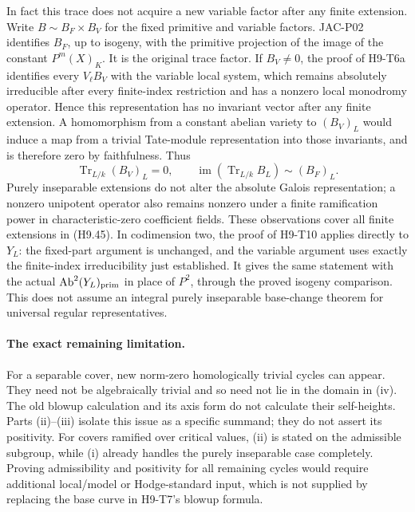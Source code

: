 In fact this trace does not acquire a new variable factor after any
finite extension. Write $B\sim B_F\times B_V$ for the fixed primitive
and variable factors. JAC-P02 identifies $B_F$, up to isogeny, with
the primitive projection of the image of the constant
$P^m(X)_K$. It is the original trace factor. If $B_V\ne0$, the proof
of H9-T6a identifies every $V_\ell B_V$ with the variable local system,
which remains absolutely irreducible after every finite-index
restriction and has a nonzero local monodromy operator. Hence this
representation has no invariant vector after any finite extension.
A homomorphism from a constant abelian variety to $(B_V)_L$ would
induce a map from a trivial Tate-module representation into those
invariants, and is therefore zero by faithfulness. Thus
\[
 \operatorname{Tr}_{L/k}(B_V)_L=0,
 \qquad
 \operatorname{im}(\operatorname{Tr}_{L/k}B_L)
        \sim (B_F)_L.                                      \tag{H9.45}
\]
Purely inseparable extensions do not alter the absolute Galois
representation; a nonzero unipotent operator also remains nonzero
under a finite ramification power in characteristic-zero coefficient
fields. These observations cover all finite extensions in (H9.45).
In codimension two, the proof of H9-T10 applies directly to $Y_L$:
the fixed-part argument is unchanged, and the variable argument uses
exactly the finite-index irreducibility just established. It gives the
same statement with the actual
$\operatorname{Ab}^2(Y_L)_{\rm prim}$ in place of $P^2$, through the
proved isogeny comparison. This does not assume an integral purely
inseparable base-change theorem for universal regular representatives.

\paragraph{The exact remaining limitation.}
For a separable cover, new norm-zero homologically trivial cycles can
appear. They need not be algebraically trivial and so need not lie in
the domain in (iv). The old blowup calculation and its axis form do not
calculate their self-heights. Parts (ii)--(iii) isolate this issue as a
specific summand; they do not assert its positivity. For covers ramified
over critical values, (ii) is stated on the admissible subgroup, while
(i) already handles the purely inseparable case completely. Proving
admissibility and positivity for all remaining cycles would require
additional local/model or Hodge-standard input, which is not supplied
by replacing the base curve in H9-T7's blowup formula.

